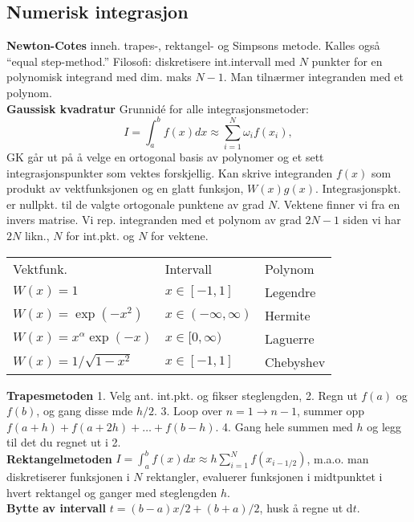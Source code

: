 \documentclass[12pt,a4paper,twocolumn]{article}
\begin{document}
\begin{flushleft}
\subsection{Numerisk integrasjon} %
\label{sub:numerisk_integrasjon}
\textbf{Newton-Cotes} inneh. trapes-, rektangel- og Simpsons metode. Kalles også ``equal step-method.'' Filosofi: diskretisere int.intervall med $N$ punkter for en polynomisk integrand med dim. maks $N-1$. Man tilnærmer integranden med et polynom.\\ 
\textbf{Gaussisk kvadratur} %
Grunnidé for alle integrasjonsmetoder:
\begin{equation*} 
   I=\int_a^bf(x)dx \approx \sum_{i=1}^N\omega_if(x_i),  
\end{equation*}
GK går ut på å velge en ortogonal basis av polynomer og et sett integrasjonspunkter som vektes forskjellig. Kan skrive integranden $f(x)$ som produkt av vektfunksjonen og en glatt funksjon, $W(x)g(x)$. Integrasjonspkt. er nullpkt. til de valgte ortogonale punktene av grad $N$. Vektene finner vi fra en invers matrise. Vi rep. integranden med et polynom av grad $2N-1$ siden vi har $2N$ likn., $N$ for int.pkt. og $N$ for vektene.\\
\begin{table}[H]
  \centering
  \begin{tabular}{ l l l }
    Vektfunk. & Intervall & Polynom \\
    $W(x)=1$&$x\in[-1,1]$&Legendre\\
    $W(x)=\exp(-x^2)$&$x\in(-\infty,\infty)$&Hermite\\
    $W(x)=x^\alpha\exp(-x)$&$x\in[0,\infty)$&Laguerre\\
    $W(x)=1/\sqrt{1-x^2}$&$x\in[-1,1]$&Chebyshev\\
  \end{tabular}
\end{table}
\textbf{Trapesmetoden} 1. Velg ant. int.pkt. og fikser steglengden, 2. Regn ut $f(a)$ og $f(b)$, og gang disse mde $h/2$. 3. Loop over $n=1\to n-1$, summer opp $f(a+h)+f(a+2h)+\ldots+f(b-h)$. 4. Gang hele summen med $h$ og legg til det du regnet ut i 2.\\
\textbf{Rektangelmetoden} $I=\int_a^bf(x) dx \approx  h\sum_{i=1}^N f(x_{i-1/2})$, m.a.o. man diskretiserer funksjonen i $N$ rektangler, evaluerer funksjonen i midtpunktet i hvert rektangel og ganger med steglengden $h$.\\
\textbf{Bytte av intervall} $t = (b-a)x/2 + (b+a)/2$, husk å regne ut d$t$.\\


\end{flushleft}
\end{document}
